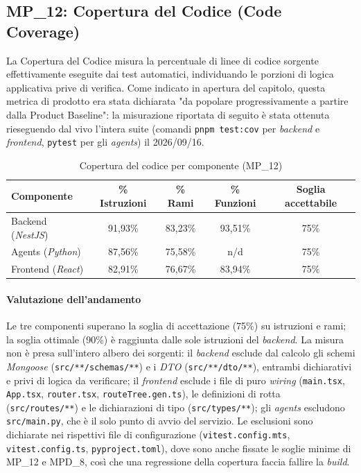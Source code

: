 \documentclass[12pt, a4paper]{article}
\begin{document}
\subsection{MP\_12: Copertura del Codice (Code Coverage)}
La Copertura del Codice misura la percentuale di linee di codice sorgente effettivamente eseguite dai test automatici, individuando le porzioni di logica applicativa prive di verifica. Come indicato in apertura del capitolo, questa metrica di prodotto era stata dichiarata "da popolare progressivamente a partire dalla Product Baseline": la misurazione riportata di seguito è stata ottenuta rieseguendo dal vivo l'intera suite (comandi \texttt{pnpm test:cov} per \textit{backend} e \textit{frontend}, \texttt{pytest} per gli \textit{agents}) il 2026/09/16.

\begin{table}[htbp]
    \centering
    \renewcommand{\arraystretch}{1.3}
    \begin{tabular}{|l|c|c|c|c|}
        \hline
        \textbf{Componente} & \textbf{\% Istruzioni} & \textbf{\% Rami} & \textbf{\% Funzioni} & \textbf{Soglia accettabile} \\ \hline
        Backend (\textit{NestJS}) & 91,93\% & 83,23\% & 93,51\% & 75\% \\ \hline
        Agents (\textit{Python}) & 87,56\% & 75,58\% & n/d & 75\% \\ \hline
        Frontend (\textit{React}) & 82,91\% & 76,67\% & 83,94\% & 75\% \\ \hline
    \end{tabular}
    \caption{Copertura del codice per componente (MP\_12)}
    \label{tab:mp12_coverage}
\end{table}

\paragraph*{Valutazione dell'andamento}
Le tre componenti superano la soglia di accettazione (75\%) su istruzioni e rami; la soglia ottimale (90\%) è raggiunta dalle sole istruzioni del \textit{backend}. La misura non è presa sull'intero albero dei sorgenti: il \textit{backend} esclude dal calcolo gli schemi \textit{Mongoose} (\texttt{src/**/schemas/**}) e i \textit{DTO} (\texttt{src/**/dto/**}), entrambi dichiarativi e privi di logica da verificare; il \textit{frontend} esclude i file di puro \textit{wiring} (\texttt{main.tsx}, \texttt{App.tsx}, \texttt{router.tsx}, \texttt{routeTree.gen.ts}), le definizioni di rotta (\texttt{src/routes/**}) e le dichiarazioni di tipo (\texttt{src/types/**}); gli \textit{agents} escludono \texttt{src/main.py}, che è il solo punto di avvio del servizio. Le esclusioni sono dichiarate nei rispettivi file di configurazione (\texttt{vitest.config.mts}, \texttt{vitest.config.ts}, \texttt{pyproject.toml}), dove sono anche fissate le soglie minime di MP\_12 e MPD\_8, così che una regressione della copertura faccia fallire la \textit{build}.
\end{document}
